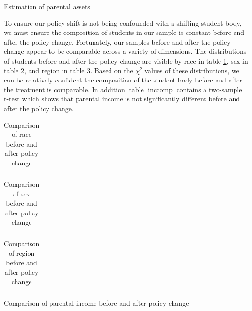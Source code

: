 \documentclass{article}
\begin{document}
	\begin{table}
		\centering
		\caption{Estimation of parental assets}
		
		\label{assetTab}
	\end{table}

	To ensure our policy shift is not being confounded with a shifting student body, we must ensure the composition of students in our sample is constant before and after the policy change. Fortunately, our samples before and after the policy change appear to be comparable across a variety of dimensions. The distributions of students before and after the policy change are visible by race in table \ref{racecomp}, sex in table \ref{sexcomp}, and region in table \ref{regioncomp}. Based on the $\chi^2$ values of these distributions, we can be relatively confident the composition of the student body before and after the treatment is comparable. In addition, table \ref{inccomp} contains a two-sample t-test which shows that parental income is not significantly different before and after the policy change. 
	
{
	\begin{table}
		\centering
		\caption{Comparison of race before and after policy change}
		\begin{tabular}{lrrrrrrrr}
						
		\end{tabular}
		\label{racecomp}
	\end{table}

	\begin{table}
		\centering
		\caption{Comparison of sex before and after policy change}
		\begin{tabular}{lrrrrrr}
			
		\end{tabular}
		\label{sexcomp}
	\end{table}

	\begin{table}
		\centering
		\caption{Comparison of region before and after policy change}
		\begin{tabular}{lrrrrrrrrrr}
			
		\end{tabular}
		\label{regioncomp}
	\end{table}

	\begin{table}
		\centering
		\caption{Comparison of parental income before and after policy change}
		
		\label{inccomp}
	\end{table}

}
	
\end{document}
